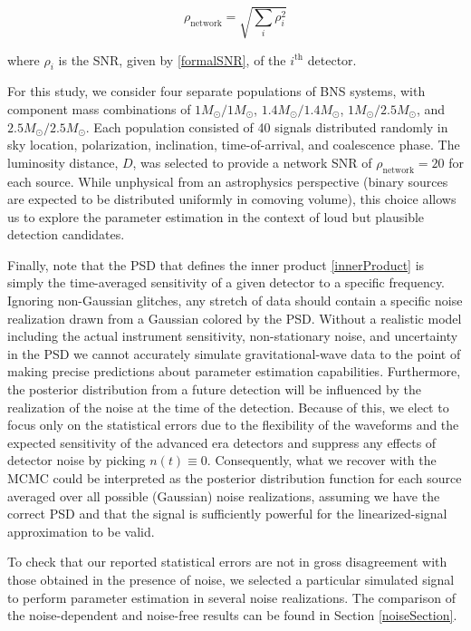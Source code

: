\documentclass[11pt,a4paper]{emulateapj} 
\begin{document}
\begin{equation}
\rho_{\text{network}} = \sqrt{\sum_i \rho_{i}^2}
\label{SNRnetwork}
\end{equation}

\noindent where $\rho_i$ is the SNR, given by \eqref{formalSNR}, of
the $i^{\text{th}}$ detector.

For this study, we consider four separate populations of BNS systems,
with component mass combinations of $1M_{\odot}/1M_{\odot}$,
$1.4M_{\odot}/1.4M_{\odot}$, $1M_{\odot}/2.5M_{\odot}$, and
$2.5M_{\odot}/2.5M_{\odot}$.  Each population consisted of 40 signals
distributed randomly in sky location, polarization, inclination,
time-of-arrival, and coalescence phase.  The luminosity distance, $D$,
was selected to provide a network SNR of $\rho_{\text{network}}=20$
for each source.  While unphysical from an astrophysics perspective
(binary sources are expected to be distributed uniformly in comoving volume), this
choice allows us to explore the parameter estimation in the context of
loud but plausible detection candidates.

Finally, note that the PSD that defines the inner
product \eqref{innerProduct} is simply the time-averaged sensitivity
of a given detector to a specific frequency.  Ignoring non-Gaussian
glitches, any stretch of data should contain a specific noise
realization drawn from a Gaussian colored by the PSD.  Without a
realistic model including the actual instrument sensitivity, non-stationary
 noise, and uncertainty in the PSD we cannot accurately
simulate gravitational-wave data to the point of making precise predictions about
parameter estimation capabilities.  Furthermore, the posterior
distribution from a future detection will be influenced by the
realization of the noise at the time of the detection.  Because of
this, we elect to focus only on the statistical errors due to the
flexibility of the waveforms and the expected sensitivity of the
advanced era detectors and suppress any effects of detector noise by
picking $n(t) \equiv 0$.
Consequently, what we recover with the MCMC could be interpreted as
the posterior distribution function for each source averaged over all
possible (Gaussian) noise realizations, assuming we have the correct
PSD and that the signal is sufficiently powerful for the linearized-signal
approximation \citep{Vallisneri} to be valid.

To check that our reported statistical errors are not in gross
disagreement with those obtained in the presence of noise, we selected
a particular simulated signal to perform parameter estimation in
several noise realizations.  The comparison of the noise-dependent and
noise-free results can be found in Section \ref{noiseSection}.
\end{document}
